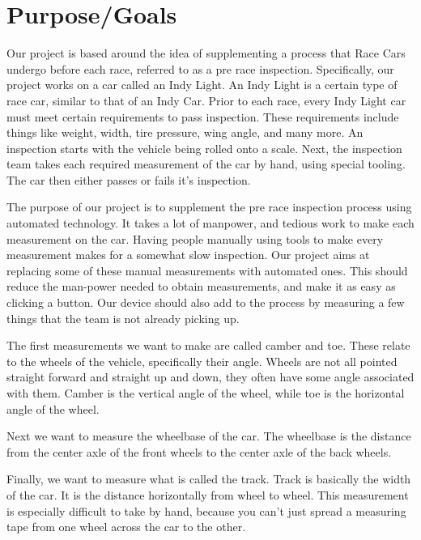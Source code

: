 \documentclass[onecolumn, draftclsnofoot,10pt, compsoc]{IEEEtran}
\begin{document}
\section{Purpose/Goals}
Our project is based around the idea of supplementing a process that Race Cars undergo before each race, referred to as a pre race inspection.  Specifically, our project works on a car called an Indy Light.  An Indy Light is a certain type of race car, similar to that of an Indy Car.  Prior to each race, every Indy Light car must meet certain requirements to pass inspection.  These requirements include things like weight, width, tire pressure, wing angle, and many more.  An inspection starts with the vehicle being rolled onto a scale.  Next, the inspection team takes each required measurement of the car by hand, using special tooling.  The car then either passes or fails it’s inspection.
\newline

\noindent The purpose of our project is to supplement the pre race inspection process using automated technology.  It takes a lot of manpower, and tedious work to make each measurement on the car.  Having people manually using tools to make every measurement makes for a somewhat slow inspection.  Our project aims at replacing some of these manual measurements with automated ones.  This should reduce the man-power needed to obtain measurements, and make it as easy as clicking a button.  Our device should also add to the process by measuring a few things that the team is not already picking up.
\newline

\noindent The first measurements we want to make are called camber and toe.  These relate to the wheels of the vehicle, specifically their angle.  Wheels are not all pointed straight forward and straight up and down, they often have some angle associated with them. Camber is the vertical angle of the wheel, while toe is the horizontal angle of the wheel.
\newline

\noindent Next we want to measure the wheelbase of the car.  The wheelbase is the distance from the center axle of the front wheels to the center axle of the back wheels.
\newline

\noindent Finally,  we want to measure what is called the track.  Track is basically the width of the car.  It is the distance horizontally from wheel to wheel.  This measurement is especially difficult to take by hand, because you can't just spread a measuring tape from one wheel across the car to the other.
\newline
\end{document}
